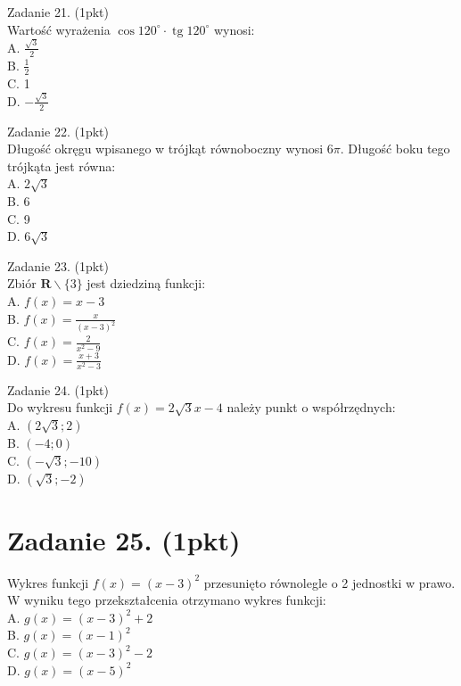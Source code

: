 \documentclass[10pt]{article}
\begin{document}
Zadanie 21. (1pkt)\\
Wartość wyrażenia \(\cos 120^{\circ} \cdot \operatorname{tg} 120^{\circ}\) wynosi:\\
A. \(\frac{\sqrt{3}}{2}\)\\
B. \(\frac{1}{2}\)\\
C. 1\\
D. \(-\frac{\sqrt{3}}{2}\)

Zadanie 22. (1pkt)\\
Długość okręgu wpisanego w trójkąt równoboczny wynosi \(6 \pi\). Długość boku tego trójkąta jest równa:\\
A. \(2 \sqrt{3}\)\\
B. 6\\
C. 9\\
D. \(6 \sqrt{3}\)

Zadanie 23. (1pkt)\\
Zbiór \(\boldsymbol{R} \backslash\{3\}\) jest dziedziną funkcji:\\
A. \(f(x)=x-3\)\\
B. \(f(x)=\frac{x}{(x-3)^{2}}\)\\
C. \(f(x)=\frac{2}{x^{2}-9}\)\\
D. \(f(x)=\frac{x+3}{x^{2}-3}\)

Zadanie 24. (1pkt)\\
Do wykresu funkcji \(f(x)=2 \sqrt{3} x-4\) należy punkt o współrzędnych:\\
A. \((2 \sqrt{3} ; 2)\)\\
B. \((-4 ; 0)\)\\
C. \((-\sqrt{3} ;-10)\)\\
D. \((\sqrt{3} ;-2)\)

\section*{Zadanie 25. (1pkt)}
Wykres funkcji \(f(x)=(x-3)^{2}\) przesunięto równolegle o 2 jednostki w prawo. W wyniku tego przekształcenia otrzymano wykres funkcji:\\
A. \(g(x)=(x-3)^{2}+2\)\\
B. \(g(x)=(x-1)^{2}\)\\
C. \(g(x)=(x-3)^{2}-2\)\\
D. \(g(x)=(x-5)^{2}\)
\end{document}
